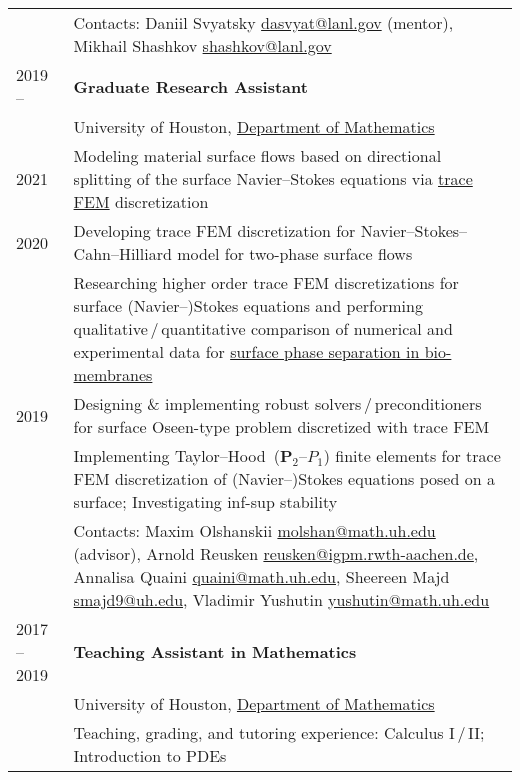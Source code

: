 \documentclass[a4paper,12pt]{article}
\begin{document}
\begin{longtable}{ l >{\raggedright\arraybackslash}p{15cm} }
			& Contacts: Daniil Svyatsky \href{mailto:dasvyat@lanl.gov}{dasvyat@lanl.gov} (mentor), Mikhail Shashkov \href{mailto:shashkov@lanl.gov}{shashkov@lanl.gov}\vspace{3mm}\\			
		2019 --
			& \textbf{Graduate Research Assistant}\vspace{1mm}\\
			& University of Houston, \href{http://www.uh.edu/nsm/math/}{Department of Mathematics}\vspace{1mm}\\
		2021 
			& Modeling material surface flows based on directional splitting of the surface Navier--Stokes equations via \href{https://www.math.uh.edu/~molshan/tracefinite.html}{trace FEM} discretization\vspace{1mm}\\
		2020
			& Developing trace FEM discretization for Navier--Stokes--Cahn--Hilliard model for two-phase surface flows\vspace{1mm}\\
			& Researching higher order trace FEM discretizations for surface (Navier--)Stokes equations and performing qualitative\,/\,quantitative comparison of numerical and experimental data for \href{https://www.math.uh.edu/~molshan/material.html}{surface phase separation in bio-membranes}\vspace{1mm}\\
		2019
			& Designing \& implementing robust solvers\,/\,preconditioners for surface Oseen-type problem discretized with trace FEM\vspace{1mm}\\
			& Implementing Taylor--Hood~($\mathbf{P}_2$--$P_1$) finite elements for trace FEM discretization of (Navier--)Stokes equations posed on a surface; Investigating inf-sup stability\vspace{1mm}\\
			& Contacts: Maxim Olshanskii \href{mailto:molshan@math.uh.edu}{molshan@math.uh.edu} (advisor), Arnold Reusken \href{mailto:reusken@igpm.rwth-aachen.de}{reusken@igpm.rwth-aachen.de}, Annalisa Quaini \href{mailto:quaini@math.uh.edu}{quaini@math.uh.edu}, Sheereen Majd \href{mailto:smajd9@uh.edu}{smajd9@uh.edu}, Vladimir Yushutin \href{mailto:yushutin@math.uh.edu}{yushutin@math.uh.edu}\vspace{3mm}\\
		2017 -- 2019
			& \textbf{Teaching Assistant in Mathematics}\vspace{1mm}\\
			& University of Houston, \href{http://www.uh.edu/nsm/math/}{Department of Mathematics}\vspace{1mm}\\
			& Teaching, grading, and tutoring experience: Calculus I\,/\,II; Introduction to PDEs
	\end{longtable}
\end{document}
